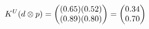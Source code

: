 \documentclass[preview]{standalone}
\begin{document}
\begin{align*}
\special{dvisvgm:raw <g id='unique000'>}K^U(d \otimes p) = \begin{pmatrix} (0.65)(0.52) \\ (0.89)(0.80) \end{pmatrix} = \begin{pmatrix} 0.34 \\ 0.70 \end{pmatrix}\special{dvisvgm:raw </g>}
\end{align*}
\end{document}
